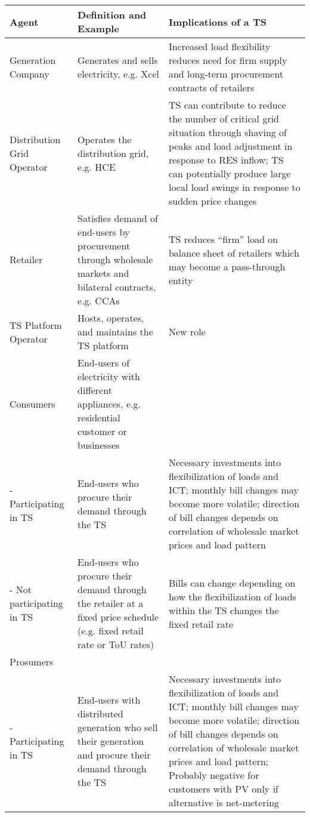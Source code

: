     \begin{longtable}{p{}p{}p{}}
        \hline
        Agent & Definition and Example & Implications of a TS
    \\  \hline
        Generation Company &
Generates and sells electricity, e.g. Xcel &
Increased load flexibility reduces need for firm supply and long-term procurement contracts of retailers
\\  \hline
        Distribution Grid Operator &
Operates the distribution grid, e.g. HCE &
TS can contribute to reduce the number of critical grid situation through shaving of peaks and load adjustment in response to RES inflow; TS can potentially produce large local load swings in response to sudden price changes
\\  \hline
        Retailer &
Satisfies demand of end-users by procurement through wholesale markets and bilateral contracts, e.g. CCAs &
TS reduces “firm” load on balance sheet of retailers which may become a pass-through entity
\\  \hline
        TS Platform Operator &
Hosts, operates, and maintains the TS platform &
New role
\\  \hline
        Consumers &
End-users of electricity with different appliances, e.g. residential customer or businesses &
\\  \hline
        - Participating in TS &
End-users who procure their demand through the TS &
Necessary investments into flexibilization of loads and ICT; monthly bill changes may become more volatile; direction of bill changes depends on correlation of wholesale market prices and load pattern
\\  \hline
        - Not participating in TS &
End-users who procure their demand through the retailer at a fixed price schedule (e.g. fixed retail rate or ToU rates) &
Bills can change depending on how the flexibilization of loads within the TS changes the fixed retail rate 
\\  \hline
Prosumers & &
\\  \hline
        - Participating in TS &
End-users with distributed generation who sell their generation and procure their demand through the TS &
Necessary investments into flexibilization of loads and ICT; monthly bill changes may become more volatile; direction of bill changes depends on correlation of wholesale market prices and load pattern; Probably negative for customers with PV only if alternative is net-metering

\end{longtable}
